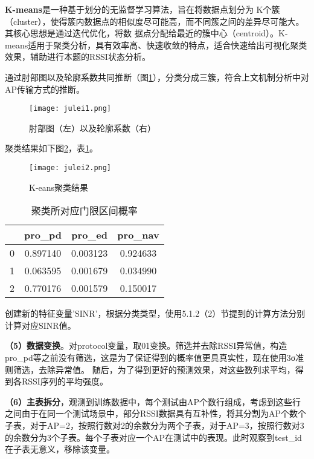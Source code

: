 \documentclass[bwprint]{gmcmthesis}
\begin{document}
\textbf{K-means}是一种基于划分的无监督学习算法，旨在将数据点划分为
K个簇（cluster），使得簇内数据点的相似度尽可能高，而不同簇之间的差异尽可能大。其核心思想是通过迭代优化，将数
据点分配给最近的簇中心（centroid）。K-means适用于聚类分析，具有效率高、快速收敛的特点，适合快速给出可视化聚类效果，辅助进行本题的RSSI状态分析。

通过肘部图以及轮廓系数共同推断（图\ref{pho:julei1}），分类分成三簇，符合上文机制分析中对AP传输方式的推断。

\begin{figure}[!htbp]
    \centering
    \texttt{[image: julei1.png]}
    \caption{\centering 肘部图（左）以及轮廓系数（右）}
    \label{pho:julei1}
\end{figure}

聚类结果如下图\ref{pho:julei2}，表\ref{tb:julei}。

\begin{figure}[!htbp]
    \centering
    \texttt{[image: julei2.png]}
    \caption{\centering K-eans聚类结果}
    \label{pho:julei2}
\end{figure}

\begin{table}[htp!]
    \centering
    \begin{tabular}{cccc}
        \hline
      & pro\_pd  & pro\_ed  & pro\_nav \\
      \hline
    0 & 0.897140 & 0.003123 & 0.924633 \\
    \hline
    1 & 0.063595 & 0.001679 & 0.034990 \\
    \hline
    2 & 0.770176 & 0.001579 & 0.150017\\
    \hline
    \end{tabular}
    \vspace{0.5cm}
    \caption{聚类所对应门限区间概率}
    \label{tb:julei}
    \end{table}

创建新的特征变量'SINR'，根据分类类型，使用5.1.2（2）节提到的计算方法分别计算对应SINR值。

\textbf{（5）数据变换}。对protocol变量，取01变换。筛选并去除RSSI异常值，构造pro\_pd等之前没有筛选，这是为了保证得到的概率值更具真实性，现在使用3σ准则筛选，去除异常值。
随后，为了得到更好的预测效果，对这些数列求平均，得到各RSSI序列的平均强度。

\textbf{（6）主表拆分}，观测到训练数据中，每个测试由AP个数行组成，考虑到这些行之间由于在同一个测试场景中，部分RSSI数据具有互补性，将其分割为AP个数个子表，对于AP=2，按照行数对2的余数分为两个子表，对于AP=3，按照行数对3的余数分为3个子表。每个子表对应一个AP在测试中的表现。此时观察到test\_id在子表无意义，移除该变量。
\end{document}
